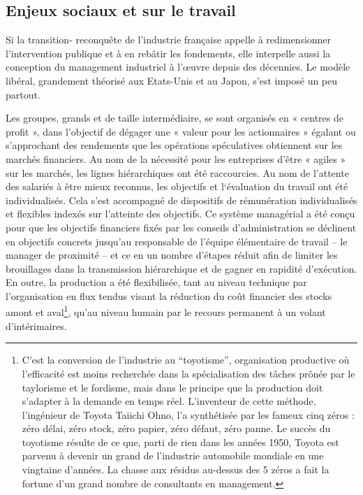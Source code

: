 \documentclass[a4paper]{article}
\begin{document}
\subsection{Enjeux sociaux et sur le travail}
Si la transition- reconquête de l’industrie française appelle à redimensionner l’intervention publique et à en rebâtir les fondements, elle interpelle  aussi la conception du management industriel à l’œuvre depuis des décennies. Le modèle libéral, grandement théorisé aux Etats-Unis et au Japon, s’est imposé un peu partout. 

Les groupes, grands et de taille intermédiaire, se sont organisés en « centres de profit », dans l’objectif de  dégager une « valeur pour les actionnaires » égalant ou s’approchant  des rendements que les opérations spéculatives obtiennent sur les marchés financiers.  Au nom de la nécessité pour les entreprises d’être « agiles » sur les marchés, les lignes hiérarchiques ont été raccourcies. Au nom de l’attente des salariés à être mieux reconnus, les objectifs  et l‘évaluation du travail ont été individualisés. Cela s’est accompagné de dispositifs de rémunération individualisés et flexibles indexés sur l’atteinte des objectifs. Ce système managérial a été conçu pour que les objectifs financiers fixés par les conseils d’administration se déclinent en objectifs concrets jusqu’au responsable de l’équipe élémentaire de travail – le manager de proximité –  et ce en un nombre d’étapes réduit afin de limiter les brouillages dans la transmission hiérarchique et de gagner en rapidité d’exécution. 
En outre, la production a été flexibilisée, tant au niveau technique par l’organisation en flux tendus visant la réduction du coût financier des stocks amont et aval\footnote{C’est la conversion de l’industrie au “toyotisme”, organisation productive où l’efficacité est moins recherchée dans la spécialisation des tâches prônée par le taylorisme et le fordisme, mais dans le principe que la production doit s’adapter à la demande en temps réel. L’inventeur de cette méthode, l’ingénieur de Toyota Taiichi Ohno, l’a synthétisée par les fameux cinq zéros : zéro délai, zéro stock, zéro papier, zéro défaut, zéro panne. Le succès du toyotisme résulte de ce que, parti de rien dans les années 1950, Toyota est parvenu à devenir un grand de l’industrie automobile mondiale en une vingtaine d’années. La chasse aux résidus au-dessus des 5 zéros a fait la fortune d’un grand nombre de consultants en management.}, qu’au niveau humain par le recours permanent à un volant d’intérimaires. 
\end{document}
